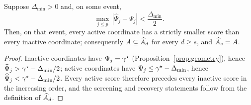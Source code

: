 \begin{lemma}\label{lem:app-separation}
Suppose $\Delta_{\min}>0$ and, on some event,
\[
 \max_{j\le p}\,|\widehat\Psi_j-\Psi_j|<\frac{\Delta_{\min}}{2}.
\]
Then, on that event, every active coordinate has a strictly smaller
score than every inactive coordinate; consequently
$A\subseteq\widehat{A}_d$ for every $d\ge s$, and
$\widehat{A}_s=A$.
\end{lemma}

\begin{proof}
Inactive coordinates have $\Psi_j=\gamma^\star$
(Proposition~\ref{prop:geometry}), hence
$\widehat\Psi_j>\gamma^\star-\Delta_{\min}/2$; active coordinates have
$\Psi_j\le\gamma^\star-\Delta_{\min}$, hence
$\widehat\Psi_j<\gamma^\star-\Delta_{\min}/2$.  Every active score therefore
precedes every inactive score in the increasing order, and the screening
and recovery statements follow from the definition of
$\widehat{A}_d$.
\end{proof}
